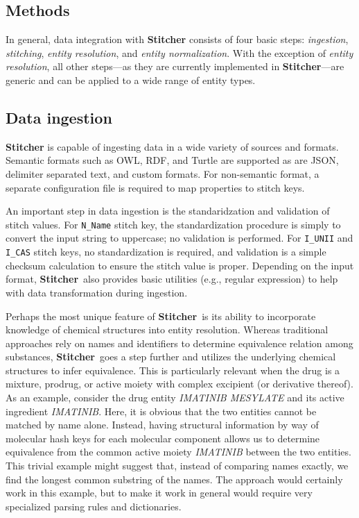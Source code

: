 \documentclass{bioinfo}
\newcommand\st{\textbf{Stitcher}}
\begin{document}
\begin{methods}
\section{Methods}\label{sec:methods}
In general, data integration with \st{} consists of four basic
steps: \emph{ingestion}, \emph{stitching}, \emph{entity resolution},
and \emph{entity normalization}. With the exception of \emph{entity
resolution}, all other steps---as they are currently implemented
in \st---are generic and can be applied to a wide range of entity
types. 

\subsection{Data ingestion}\label{sec:methods-ingest}
\st{} is capable of ingesting data in a wide variety of sources and
formats. Semantic formats such as OWL, RDF, and Turtle are supported
as are JSON, delimiter separated text, and custom formats. For
non-semantic format, a separate configuration file is required to map
properties to stitch keys. 

An important step in data ingestion is the standaridzation and
validation of stitch values. For \texttt{N\_Name} stitch key, the
standardization procedure is simply to convert the input string to
uppercase; no validation is performed. For \texttt{I\_UNII}
and \texttt{I\_CAS} stitch keys, no standardization is required, and
validation is a simple checksum calculation to ensure the stitch value
is proper. Depending on the input format, \st\ also provides basic
utilities (e.g., regular expression) to help with data transformation
during ingestion. 

Perhaps the most unique feature of \st\ is its ability to incorporate
knowledge of chemical structures into entity resolution. Whereas
traditional approaches rely on names and identifiers to determine
equivalence relation among substances, \st\ goes a step further and
utilizes the underlying chemical structures to infer equivalence. This
is particularly relevant when the drug is a mixture, prodrug, or
active moiety with complex excipient (or derivative thereof). As an
example, consider the drug entity \emph{IMATINIB MESYLATE} and its
active ingredient \emph{IMATINIB}. Here, it is obvious that the two
entities cannot be matched by name alone. Instead, having structural
information by way of molecular hash keys for each molecular component
allows us to determine equivalence from the common active
moiety \emph{IMATINIB} between the two entities. This trivial example
might suggest that, instead of comparing names exactly, we find the
longest common substring of the names. The approach would certainly
work in this example, but to make it work in general would require
very specialized parsing rules and dictionaries. 


\end{methods}
\end{document}
